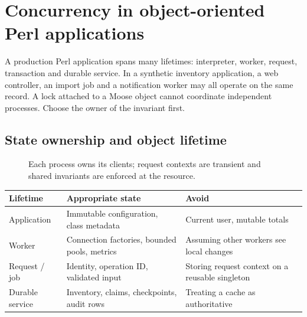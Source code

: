 \chapter{Concurrency in object-oriented Perl applications}
\label{ch:enterprise-objects}

A production Perl application spans many lifetimes: interpreter, worker,
request, transaction and durable service. In a synthetic inventory application,
a web controller, an import job and a notification worker may all operate on
the same record. A lock attached to a Moose object cannot coordinate
independent processes. Choose the owner of the invariant first.

\section{State ownership and object lifetime}
\begin{figure}[!htbp]\centering
{}
\caption{Each process owns its clients; request contexts are transient and shared invariants are enforced at the resource.}
\end{figure}

\begin{longtable}{L{.22\linewidth}L{.33\linewidth}L{.37\linewidth}}
\toprule Lifetime & Appropriate state & Avoid \\ \midrule\endhead
Application & Immutable configuration, class metadata & Current user, mutable totals \\
Worker & Connection factories, bounded pools, metrics & Assuming other workers see local changes \\
Request / job & Identity, operation ID, validated input & Storing request context on a reusable singleton \\
Durable service & Inventory, claims, checkpoints, audit rows & Treating a cache as authoritative \\
\bottomrule
\end{longtable}

